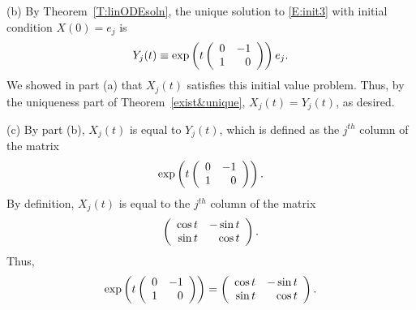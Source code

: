 \documentclass{ximera}
\begin{document}
\begin{computerExercise}
\begin{solution}
(b) By Theorem~\ref{T:linODEsoln}, the unique
solution to \eqref{E:init3} with initial condition $X(0) = e_j$ is
\[
Y_j(t) \equiv \exp\left(t\left(\begin{array}{rr} 0 & -1\\ 1 &0\end{array}\right)\right)e_j.
\]
We showed in part (a) that $X_j(t)$ satisfies this initial value
problem.  Thus, by the uniqueness part of Theorem~\ref{exist&unique},
$X_j(t) = Y_j(t)$, as desired.

(c) By part (b), $X_j(t)$ is equal to $Y_j(t)$, which is defined as
the $j^{th}$ column of the matrix
\[
\exp\left(t\left(\begin{array}{rr} 0 & -1\\ 1 &0\end{array}\right)\right).
\]
By definition, $X_j(t)$ is equal to the $j^{th}$ column of the matrix
\[
\left(\begin{array}{rr} \cos t & -\sin t\\ \sin t &\cos t\end{array}\right).
\]
Thus,
\[
\exp\left(t\left(\begin{array}{rr} 0 & -1\\ 1 &0\end{array}\right)\right) =
\left(\begin{array}{rr} \cos t & -\sin t\\ \sin t &\cos t\end{array}\right).
\]

\end{solution}
\end{computerExercise}
\end{document}
